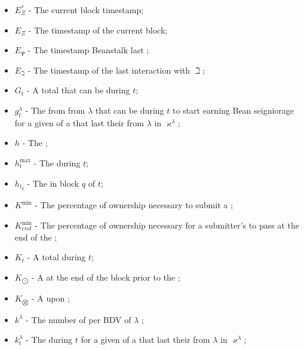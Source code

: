 \documentclass[class=article, crop=false]{standalone}
\begin{document}
\begin{itemize}[topsep=0pt, itemsep=3pt,leftmargin=16pt]
    \item[] $E_{\Xi}^*$ - \hypertarget{ht73}{The current block timestamp};
    \item[] $E_\Xi$ - The timestamp of the current block;
    \item[] $E_{\Psi}$ - \hypertarget{ht78}{The timestamp Beanstalk last };
    \item[] $E_{\beth}$ - \hypertarget{ht72}{The timestamp of the last interaction with $\beth$};
    \item[] $G_t$ - \hypertarget{ht100}{A  total  that can be  during $t$};
    \item[] $g_{t}^{\lambda}$ - \hypertarget{ht101}{The  from  from \hyperlink{ht126}{$\lambda$}  that can be  during $t$ to start earning Bean seigniorage for a given  of a  that last  their  from \hyperlink{ht126}{$\lambda$}  in $\varkappa^{\lambda}$};
    \item[] $h$ - \hypertarget{ht110}{The };
    \item[] $h_t^{\text{max}}$ - The  during $t$;
    \item[] $h_{t_q}$ - The  in block $q$ of $t$;
    \item[] $K^{\text{min}}$ - \hypertarget{ht119}{The percentage of  ownership necessary to submit a };
    \item[] $K_{end}^{\text{min}}$ - The percentage of  ownership necessary for a submitter's  to pass at the end of the ;
    \item[] $K_t$ - \hypertarget{ht118}{A  total  during $t$};
    \item[] $K_{\bigodot}$ - \hypertarget{ht116}{A   at the end of the block prior to the };
    \item[] $K_{\bigotimes}$ - \hypertarget{ht117}{A   upon };
    \item[] $k^{\lambda}$ - \hypertarget{ht120}{The number of  per BDV of $\lambda$ };
    \item[] $k_{t}^{\lambda}$ - \hypertarget{ht121}{The  during $t$ for a given  of a  that last  their  from \hyperlink{ht126}{$\lambda$}  in $\varkappa^{\lambda}$};

\end{itemize}
\end{document}
